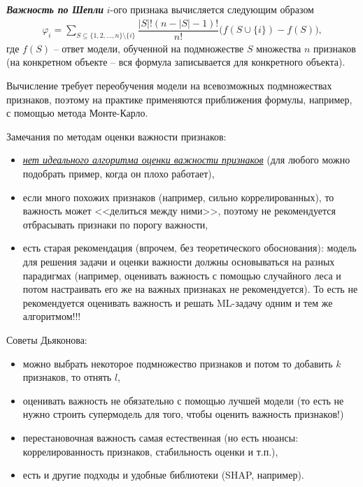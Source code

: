 \documentclass[%
	11pt,
	a4paper,
	utf8,
		]{article}
\begin{document}
\textbf{\emph{Важность по Шепли}} $ i $-ого признака вычисляется следующим образом
\begin{align*}
	\varphi_i = \sum_{S \subseteq \{1, 2, \ldots, n\} \setminus \{i\}} \dfrac{ | S |! (n - |S| - 1)! }{ n! } \big( f(S \cup \{i\}) - f(S) \big),
\end{align*}
где $ f(S) $ -- ответ модели, обученной на подмножестве $ S $ множества $ n $ признаков (на конкретном объекте -- вся формула записывается для конкретного объекта).

Вычисление требует переобучения модели на всевозможных подмножествах признаков, поэтому на практике применяются приближения формулы, например, с помощью метода Монте-Карло.

Замечания по методам оценки важности признаков:
\begin{itemize}
	\item \underline{\itshape нет идеального алгоритма оценки важности признаков} (для любого можно подобрать пример, когда он плохо работает),
	
	\item если много похожих признаков (например, сильно коррелированных), то важность может <<делиться между ними>>, поэтому не рекомендуется отбрасывать признаки по порогу важности,
	
	\item есть старая рекомендация (впрочем, без теоретического обоснования): модель для решения задачи и оценки важности должны основываться на разных парадигмах (например, оценивать важность с помощью случайного леса и потом настраивать его же на важных признаках не рекомендуется). {\color{blue}То есть не рекомендуется оценивать важность и решать ML-задачу одним и тем же алгоритмом!!!}
\end{itemize}

Советы Дьяконова:
\begin{itemize}
	\item можно выбрать некоторое подмножество признаков и потом то добавить $ k $ признаков, то отнять $ l $,
	
	\item оценивать важность не обязательно с помощью лучшей модели (то есть не нужно строить супермодель для того, чтобы оценить важность признаков!)
	
	\item перестановочная важность самая естественная (но есть нюансы: коррелированность признаков, стабильность оценки и т.п.),
	
	\item есть и другие подходы и удобные библиотеки (SHAP, например).
\end{itemize}
\end{document}

